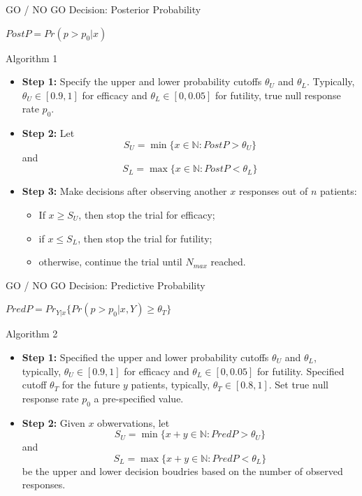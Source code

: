 \begin{frame}{GO / NO GO Decision: Posterior Probability}

\(PostP=Pr(p>p_0|x)\)

\begin{block}{Algorithm 1}

\begin{itemize}
\tightlist
\item
  \textbf{Step 1:} Specify the upper and lower probability cutoffs
  \(\theta_U\) and \(\theta_L\). Typically, \(\theta_U \in [0.9,1]\) for
  efficacy and \(\theta_L \in [0,0.05]\) for futility, true null
  response rate \(p_0\).
\item
  \textbf{Step 2:} Let
  \[S_U =\min \{x \in \mathbb{N}:  PostP > \theta_U \}\] and
  \[ S_L =\max \{x \in \mathbb{N}:  PostP < \theta_L \}\]
\item
  \textbf{Step 3:} Make decisions after observing another \(x\)
  responses out of \(n\) patients:

  \begin{itemize}
  \tightlist
  \item
    If \(x \ge S_U\), then stop the trial for efficacy;
  \item
    if \(x \le S_L\), then stop the trial for futility;
  \item
    otherwise, continue the trial until \(N_{max}\) reached.
  \end{itemize}
\end{itemize}

\end{block}

\end{frame}

\begin{frame}{GO / NO GO Decision: Predictive Probability}

\(PredP = Pr_{Y|x} \{Pr(p>p_0|x, Y) \ge \theta_T \}\)

\begin{block}{Algorithm 2}

\begin{itemize}
\tightlist
\item
  \textbf{Step 1:} Specified the upper and lower probability cutoffs
  \(\theta_U\) and \(\theta_L\), typically, \(\theta_U \in [0.9,1]\) for
  efficacy and \(\theta_L \in [0,0.05]\) for futility. Specified cutoff
  \(\theta_T\) for the future \(y\) patients, typically,
  \(\theta_T \in [0.8,1]\). Set true null response rate \(p_0\) a
  pre-specified value.
\item
  \textbf{Step 2:} Given \(x\) obwervations, let
  \[S_U =\min \{x+y \in \mathbb{N}:  PredP > \theta_U \}\] and
  \[ S_L =\max \{x+y \in \mathbb{N}:  PredP < \theta_L \}\] be the upper
  and lower decision boudries based on the number of observed responses.
\end{itemize}

\end{block}

\end{frame}

